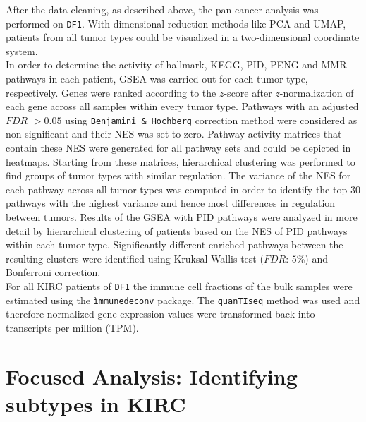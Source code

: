 \documentclass[
  parskip,
  oneside]{scrreprt}
\begin{document}
After the data cleaning, as described above, the pan-cancer analysis was
performed on \texttt{DF1}. With dimensional reduction methods like PCA
and UMAP, patients from all tumor types could be visualized in a
two-dimensional coordinate system.\\
In order to determine the activity of hallmark, KEGG, PID, PENG and MMR
pathways in each patient, GSEA was carried out for each tumor type,
respectively. Genes were ranked according to the \(z\)-score after
\(z\)-normalization of each gene across all samples within every tumor
type. Pathways with an adjusted \(FDR\) \(>0.05\) using
\texttt{Benjamini\ \&\ Hochberg} correction method were considered as
non-significant and their NES was set to zero. Pathway activity matrices
that contain these NES were generated for all pathway sets and could be
depicted in heatmaps. Starting from these matrices, hierarchical
clustering was performed to find groups of tumor types with similar
regulation. The variance of the NES for each pathway across all tumor
types was computed in order to identify the top 30 pathways with the
highest variance and hence most differences in regulation between
tumors. Results of the GSEA with PID pathways were analyzed in more
detail by hierarchical clustering of patients based on the NES of PID
pathways within each tumor type. Significantly different enriched
pathways between the resulting clusters were identified using
Kruksal-Wallis test (\(FDR\): \(5\)\%) and Bonferroni correction.\\
For all KIRC patients of \texttt{DF1} the immune cell fractions of the
bulk samples were estimated using the \texttt{ìmmunedeconv} package. The
\texttt{quanTIseq} method was used and therefore normalized gene
expression values were transformed back into transcripts per million
(TPM).

\hypertarget{focused-analysis-identifying-subtypes-in-kirc}{%
\section{Focused Analysis: Identifying subtypes in
KIRC}\label{focused-analysis-identifying-subtypes-in-kirc}}
\end{document}
